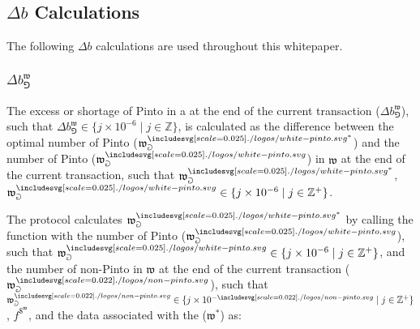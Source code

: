 \documentclass[class=article, crop=false]{standalone}
\begin{document}

\subsection{$\Delta b$ Calculations}

The following $\Delta b$ calculations are used throughout this whitepaper.


\subsubsection{$\Delta b_{\Game}^{\mathfrak{w}}$}

The excess or shortage of Pinto in a  at the end of the current transaction ($\Delta b_{\Game}^{\mathfrak{w}}$), such that $\Delta b_{\Game}^{\mathfrak{w}} \in \{j \times 10^{-6} \mid j \in \mathbb{Z}\}$, is calculated as the difference between the optimal number of Pinto ($\mathfrak{w}_{\Game}^{\pinto^{*}}$) and the number of Pinto ($\mathfrak{w}_{\Game}^{\pinto}$) in $\mathfrak{w}$ at the end of the current transaction, such that $\mathfrak{w}_{\Game}^{\pinto^{*}}$, $\mathfrak{w}_{\Game}^{\pinto} \in \{j \times 10^{-6} \mid j \in \mathbb{Z}^{+}\}$.

The protocol calculates $\mathfrak{w}_{\Game}^{\pinto^{*}}$ by calling the   function with the number of Pinto ($\mathfrak{w}_{\Game}^{\pinto}$), such that $\mathfrak{w}_{\Game}^{\pinto} \in \{j \times 10^{-6} \mid j \in \mathbb{Z}^{+} \}$, and the number of non-Pinto in $\mathfrak{w}$ at the end of the current transaction ($\mathfrak{w}_{\Game}^{\nonpinto}$), such that $\mathfrak{w}_{\Game}^{\nonpinto} \in \{j \times 10^{-\nonpinto} \mid j \in \mathbb{Z}^{+} \}$, $f^{\$^\mathfrak{w}}$, and the data associated with the  ($\mathfrak{w}^{*}$) as:
\end{document}
